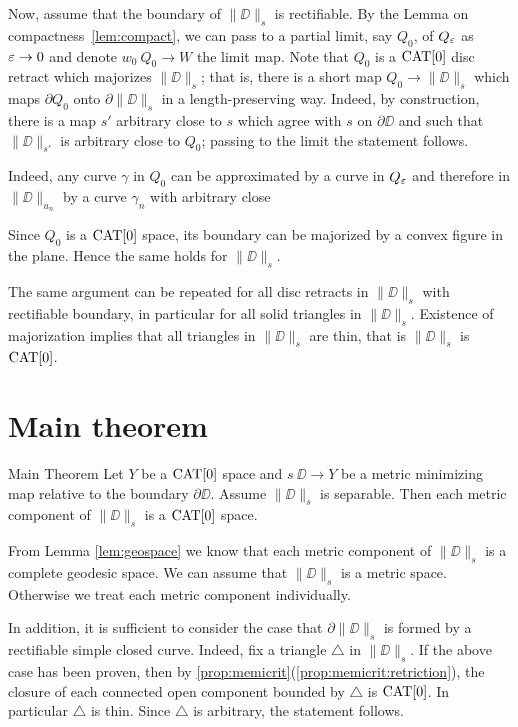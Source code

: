 \documentclass{article}
\begin{document}
Now, assume that the boundary of $\|\DD\|_s$ is rectifiable.
By the Lemma on compactness~\ref{lem:compact},
we can pass to a partial limit, say $Q_0$, of $Q_\varepsilon$ as $\varepsilon\to 0$ and denote $w_0\:Q_0\to W$ the limit map.
Note that $Q_0$ is a $\mathop{\rm CAT}\nolimits[0]$ disc retract which majorizes $\|\DD\|_s$;
that is, there is a short map $Q_0\to \|\DD\|_s$ which maps $\partial Q_0$ onto  $\partial \|\DD\|_s$ in a length-preserving way.
Indeed, by construction, there is a map $s'$ arbitrary close to $s$ which agree with $s$ on $\partial \DD$ and such that $\|\DD\|_{s'}$ is arbitrary close to $Q_0$; passing to the limit the statement follows.

Indeed, any curve $\gamma$ in $Q_0$ can be approximated by a curve in $Q_\varepsilon$ 
and therefore in $\|\DD\|_{u_n}$ by a curve $\gamma_n$ 
with arbitrary close 

Since $Q_0$ is a $\mathop{\rm CAT}\nolimits[0]$ space, its boundary can be majorized by a convex figure in the plane.
Hence the same holds for $\|\DD\|_s$.

The same argument can be repeated for all disc retracts in $\|\DD\|_s$ with rectifiable boundary, in particular for all solid triangles in $\|\DD\|_s$.
Existence of majorization implies that all triangles in $\|\DD\|_s$ are thin, that is $\|\DD\|_s$ is $\mathop{\rm CAT}\nolimits[0]$.
\qeds

\section{Main theorem}\label{Main theorem}

\begin{thm}{Main Theorem}\label{thm:main}
Let $Y$ be a $\mathop{\rm CAT}\nolimits[0]$ space 
and $s\:\DD\to Y$ be a metric minimizing map relative to the boundary $\partial\DD$.
Assume $\|\DD\|_s$  is separable. 
Then each metric component of $\|\DD\|_s$ is a $\mathop{\rm CAT}\nolimits[0]$ space. 
\end{thm}

From Lemma \ref{lem:geospace} we know that each metric component of $\|\DD\|_s$ is a complete geodesic space.
We can assume that $\|\DD\|_s$ is a metric space.
Otherwise we treat each metric component 
individually.

In addition, it is sufficient to consider
the case that $\partial \|\DD\|_s$ is formed by a rectifiable simple closed curve.
Indeed, fix a triangle $\triangle$ in $\|\DD\|_s$. 
If the above case has been proven, then by \ref{prop:memicrit}(\ref{prop:memicrit:retriction}),
the closure of each connected open component bounded by $\triangle$ is $\mathop{\rm CAT}\nolimits[0]$.
In particular $\triangle$ is thin.
Since $\triangle$ is arbitrary, the statement follows.
\end{document}
